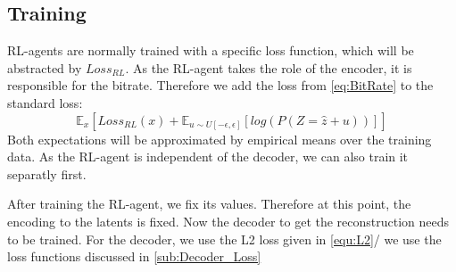     




\subsection{Training}
    RL-agents are normally trained with a specific loss function, which will be
    abstracted by $Loss_{RL}$. As the RL-agent takes the role of the encoder, it
    is responsible for the bitrate. Therefore we add the loss from
    \ref{eq:BitRate} to the standard loss:
    \begin{equation}
        \mathbb{E}_{x}[Loss_{RL}(x) + \mathbb{E}_{u \sim U[-\epsilon, \epsilon]}[log(P(Z=\hat{z} + u))]]
    \end{equation}
    Both expectations will be approximated by empirical means over the training
    data. As the RL-agent is independent of the decoder, we can also train it
    separatly first.

    After training the RL-agent, we fix its values. Therefore at this point, the
    encoding to the latents is fixed. Now the decoder to get the reconstruction
    needs to be trained. For the decoder, we use the L2 loss given in \ref{equ:L2}/ we use the loss functions discussed in \ref{sub:Decoder_Loss}


